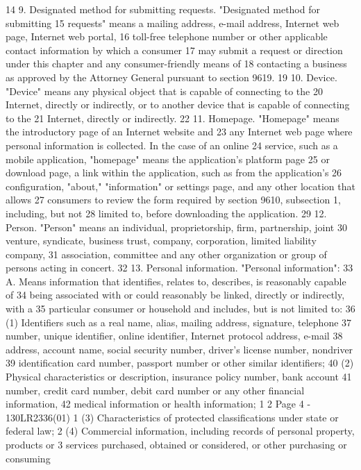 14 9. Designated method for submitting requests. "Designated method for submitting
15 requests" means a mailing address, e-mail address, Internet web page, Internet web portal,
16 toll-free telephone number or other applicable contact information by which a consumer
17 may submit a request or direction under this chapter and any consumer-friendly means of
18 contacting a business as approved by the Attorney General pursuant to section 9619.
19 10. Device. "Device" means any physical object that is capable of connecting to the
20 Internet, directly or indirectly, or to another device that is capable of connecting to the
21 Internet, directly or indirectly.
22 11. Homepage. "Homepage" means the introductory page of an Internet website and
23 any Internet web page where personal information is collected. In the case of an online
24 service, such as a mobile application, "homepage" means the application's platform page
25 or download page, a link within the application, such as from the application's
26 configuration, "about," "information" or settings page, and any other location that allows
27 consumers to review the form required by section 9610, subsection 1, including, but not
28 limited to, before downloading the application.
29 12. Person. "Person" means an individual, proprietorship, firm, partnership, joint
30 venture, syndicate, business trust, company, corporation, limited liability company,
31 association, committee and any other organization or group of persons acting in concert.
32 13. Personal information. "Personal information":
33 A. Means information that identifies, relates to, describes, is reasonably capable of
34 being associated with or could reasonably be linked, directly or indirectly, with a
35 particular consumer or household and includes, but is not limited to:
36 (1) Identifiers such as a real name, alias, mailing address, signature, telephone
37 number, unique identifier, online identifier, Internet protocol address, e-mail
38 address, account name, social security number, driver's license number, nondriver
39 identification card number, passport number or other similar identifiers;
40 (2) Physical characteristics or description, insurance policy number, bank account
41 number, credit card number, debit card number or any other financial information,
42 medical information or health information;
1
2
Page 4 - 130LR2336(01)
1 (3) Characteristics of protected classifications under state or federal law;
2 (4) Commercial information, including records of personal property, products or
3 services purchased, obtained or considered, or other purchasing or consuming

